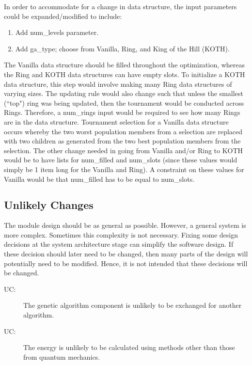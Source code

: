 \documentclass[12pt, titlepage]{article}
\newcounter{ucnum}
\newcommand{\uctheucnum}{UC\theucnum}
\begin{document}
In order to accommodate for a change in data structure, the input parameters 
could be expanded/modified to include:
\begin{enumerate}
	\item Add num\_levels parameter.
	\item Add ga\_type; choose from Vanilla, Ring, and King of the Hill (KOTH).
\end{enumerate}

The Vanilla data structure should be filled throughout the optimization, 
whereas the Ring and KOTH data structures can have empty slots. To initialize a 
KOTH data structure, this step would involve making many Ring data structures 
of varying sizes. The updating rule would also change such that unless the 
smallest (``top") ring was being updated, then the tournament would be 
conducted across Rings. Therefore, a num\_rings input would be required to see 
how many Rings are in the data structure. Tournament selection for a Vanilla 
data structure occurs whereby the two worst population members from a selection 
are replaced with two children as generated from the two best population 
members from the selection. The other change needed in going from Vanilla 
and/or Ring to KOTH would be to have lists for num\_filled and num\_slots 
(since these values would simply be 1 item long for the Vanilla and Ring). A 
constraint on these values for Vanilla would be that num\_filled has to be 
equal to num\_slots.

\subsection{Unlikely Changes} \label{SecUchange}

The module design should be as general as possible. However, a general system is
more complex. Sometimes this complexity is not necessary. Fixing some design
decisions at the system architecture stage can simplify the software design. If
these decision should later need to be changed, then many parts of the design
will potentially need to be modified. Hence, it is not intended that these
decisions will be changed.

\begin{description}
\item[ \uctheucnum \label{ucGA}:] The genetic algorithm 
component is unlikely to be exchanged for another algorithm.
\item[ \uctheucnum \label{ucEnery}:] The energy is 
unlikely to be calculated using methods other than those from quantum mechanics.
\end{description}
\end{document}
